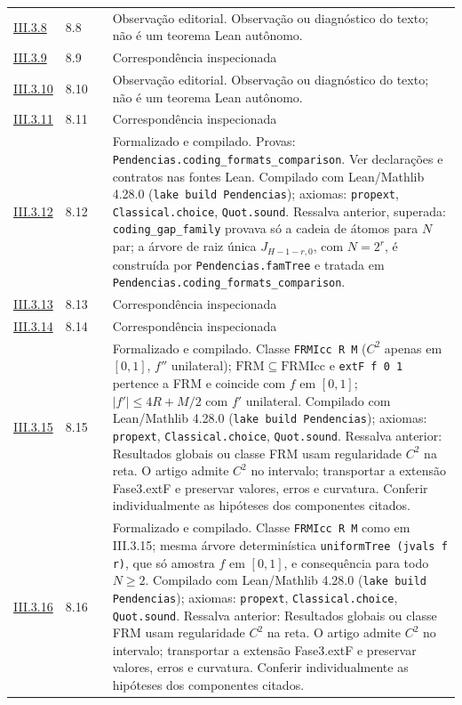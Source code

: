 \documentclass[12pt,a4paper]{article}
\theoremstyle{preciso}
\theoremstyle{definition}
\newcommand{\code}[1]{\nolinkurl{#1}}
\theoremstyle{preciso}
\theoremstyle{preciso}
\theoremstyle{preciso}
\theoremstyle{preciso}
\theoremstyle{definition}
\theoremstyle{preciso}
\theoremstyle{definition}
\theoremstyle{preciso}
\theoremstyle{preciso}
\theoremstyle{definition}
\begin{document}
\begin{singlespace}
\begin{longtable}{@{}p{.11\linewidth}p{.09\linewidth}p{.09\linewidth}p{.59\linewidth}@{}}
\hyperref[map:artigo_2:3.8]{III.3.8} & 8.8 & \pageref{map:artigo_2:3.8} & Observação editorial. Observação ou diagnóstico do texto; não é um teorema Lean autônomo.\\[4pt]
\hyperref[map:artigo_2:3.9]{III.3.9} & 8.9 & \pageref{map:artigo_2:3.9} & Correspondência inspecionada\\[4pt]
\hyperref[map:artigo_2:3.10]{III.3.10} & 8.10 & \pageref{map:artigo_2:3.10} & Observação editorial. Observação ou diagnóstico do texto; não é um teorema Lean autônomo.\\[4pt]
\hyperref[map:artigo_2:3.11]{III.3.11} & 8.11 & \pageref{map:artigo_2:3.11} & Correspondência inspecionada\\[4pt]
\hyperref[map:artigo_2:3.12]{III.3.12} & 8.12 & \pageref{map:artigo_2:3.12} & Formalizado e compilado. Provas: \code{Pendencias.coding_formats_comparison}. Ver declarações e contratos nas fontes Lean. Compilado com Lean/Mathlib 4.28.0 (\texttt{lake build Pendencias}); axiomas: \texttt{propext}, \texttt{Classical.choice}, \texttt{Quot.sound}. Ressalva anterior, superada: \code{coding_gap_family} provava só a cadeia de átomos para $N$ par; a árvore de raiz única $J_{H-1-r,0}$, com $N=2^r$, é construída por \code{Pendencias.famTree} e tratada em \code{Pendencias.coding_formats_comparison}.\\[4pt]
\hyperref[map:artigo_2:3.13]{III.3.13} & 8.13 & \pageref{map:artigo_2:3.13} & Correspondência inspecionada\\[4pt]
\hyperref[map:artigo_2:3.14]{III.3.14} & 8.14 & \pageref{map:artigo_2:3.14} & Correspondência inspecionada\\[4pt]
\hyperref[map:artigo_2:3.15]{III.3.15} & 8.15 & \pageref{map:artigo_2:3.15} & Formalizado e compilado. Classe \texttt{FRMIcc R M} ($C^2$ apenas em $[0,1]$, $f''$ unilateral); $\mathrm{FRM}\subseteq\mathrm{FRMIcc}$ e \texttt{extF f 0 1} pertence a FRM e coincide com $f$ em $[0,1]$; $|f'|\le 4R+M/2$ com $f'$ unilateral. Compilado com Lean/Mathlib 4.28.0 (\texttt{lake build Pendencias}); axiomas: \texttt{propext}, \texttt{Classical.choice}, \texttt{Quot.sound}. Ressalva anterior: Resultados globais ou classe FRM usam regularidade $C^2$ na reta. O artigo admite $C^2$ no intervalo; transportar a extensão Fase3.extF e preservar valores, erros e curvatura. Conferir individualmente as hipóteses dos componentes citados.\\[4pt]
\hyperref[map:artigo_2:3.16]{III.3.16} & 8.16 & \pageref{map:artigo_2:3.16} & Formalizado e compilado. Classe \texttt{FRMIcc R M} como em III.3.15; mesma árvore determinística \texttt{uniformTree (jvals f r)}, que só amostra $f$ em $[0,1]$, e consequência para todo $N\ge 2$. Compilado com Lean/Mathlib 4.28.0 (\texttt{lake build Pendencias}); axiomas: \texttt{propext}, \texttt{Classical.choice}, \texttt{Quot.sound}. Ressalva anterior: Resultados globais ou classe FRM usam regularidade $C^2$ na reta. O artigo admite $C^2$ no intervalo; transportar a extensão Fase3.extF e preservar valores, erros e curvatura. Conferir individualmente as hipóteses dos componentes citados.\\[4pt]

\end{longtable}
\end{singlespace}
\end{document}
